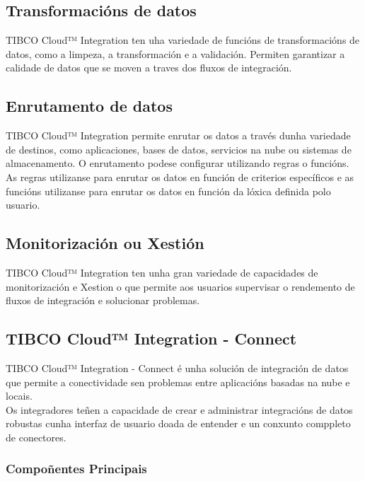 \subsection{Transformacións de datos}

TIBCO Cloud™ Integration ten uha variedade de funcións de transformacións de datos, como a limpeza, a transformación e a validación. Permiten garantizar a calidade de datos que se moven a traves dos fluxos de integración.

\subsection{Enrutamento de datos}

TIBCO Cloud™ Integration permite enrutar os datos a través dunha variedade de destinos, como aplicaciones, bases de datos, servicios na nube ou sistemas de almacenamento.
O enrutamento podese configurar utilizando regras o funcións. As regras utilizanse para enrutar os datos en función de criterios específicos e as funcións utilizanse para enrutar os datos en función da lóxica definida polo usuario.

\subsection{Monitorización ou Xestión}

TIBCO Cloud™ Integration ten unha gran variedade de capacidades de monitorización e Xestion o que permite aos usuarios supervisar o rendemento de fluxos de integración e solucionar problemas.

\subsection{TIBCO Cloud™ Integration - Connect}

TIBCO Cloud™ Integration - Connect é  unha solución de integración de datos que permite a conectividade sen problemas entre aplicacións basadas na nube e locais.\\
Os integradores teñen a capacidade de crear e administrar integracións de datos robustas cunha interfaz de usuario doada de entender e un conxunto comppleto de conectores.\\

\subsubsection{Compoñentes Principais}

